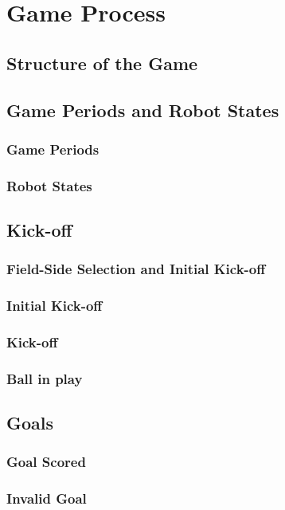 \section{Game Process}
\label{sec:game}

\subsection{Structure of the Game}
\label{sec:game_structure}

\subsection{Game Periods and Robot States}
\label{sec:game_states}
\subsubsection{Game Periods}
\subsubsection{Robot States}

\subsection{Kick-off}
\subsubsection{Field-Side Selection and Initial Kick-off}
\subsubsection{Initial Kick-off}
\subsubsection{Kick-off}
\subsubsection{Ball in play}

\subsection{Goals}
\subsubsection{Goal Scored}
\subsubsection{Invalid Goal}
